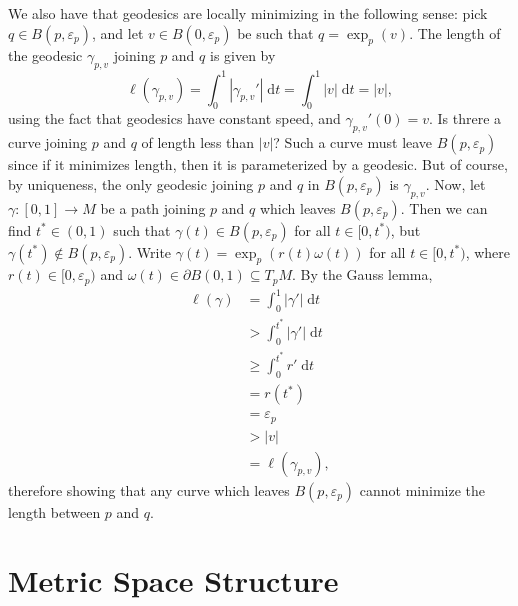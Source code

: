 \documentclass{book}
\renewcommand{\d}{\mathrm{d}}
\renewcommand{\epsilon}{\varepsilon}
\newcommand{\abs}[1]{\left\lvert {#1} \right\rvert}
\theoremstyle{definition}
\numberwithin{equation}{section}
\begin{document}
We also have that geodesics are locally minimizing in the following sense: pick $q \in B(p,\epsilon_p)$, and let $v \in B(0,\epsilon_p)$ be such that $q = \exp_p(v)$. The length of the geodesic $\gamma_{p,v}$ joining $p$ and $q$ is given by 
\begin{equation}
    \ell(\gamma_{p,v}) = \int_0^1 \abs{\gamma_{p,v}'} \; \d{t} 
                       = \int_0^1 \abs{v} \; \d{t} 
                       = \abs{v},
\end{equation} 
using the fact that geodesics have constant speed, and $\gamma_{p,v}'(0) = v$. Is threre a curve joining $p$ and $q$ of length less than $\abs{v}$? Such a curve must leave $B(p,\epsilon_p)$ since if it minimizes length, then it is parameterized by a geodesic. But of course, by uniqueness, the only geodesic joining $p$ and $q$ in $B(p,\epsilon_p)$ is $\gamma_{p,v}$. Now, let $\gamma \colon [0,1] \to M$ be a path joining $p$ and $q$ which leaves $B(p,\epsilon_p)$. Then we can find $t^* \in (0,1)$ such that $\gamma(t) \in B(p,\epsilon_p)$ for all $t \in [0,t^*)$, but $\gamma(t^*) \notin B(p,\epsilon_p)$. Write $\gamma(t) = \exp_p(r(t)\omega(t))$ for all $t \in [0,t^*)$, where $r(t) \in [0,\epsilon_p)$ and $\omega(t) \in \partial B(0,1) \subseteq T_p M$. By the Gauss lemma,
\begin{equation} \begin{aligned}
    \ell(\gamma) &= \int_0^1 \abs{\gamma'} \; \d{t} \\
                 &> \int_0^{t^*} \abs{\gamma'} \; \d{t} \\
                 &\geq \int_0^{t^*} r' \; \d{t} \\
                 &= r(t^*) \\
                 &= \epsilon_p \\
                 &> \abs{v} \\
                 &= \ell(\gamma_{p,v}),
\end{aligned} \end{equation}
therefore showing that any curve which leaves $B(p,\epsilon_p)$ cannot minimize the length between $p$ and $q$.


\section{Metric Space Structure}
\end{document}
